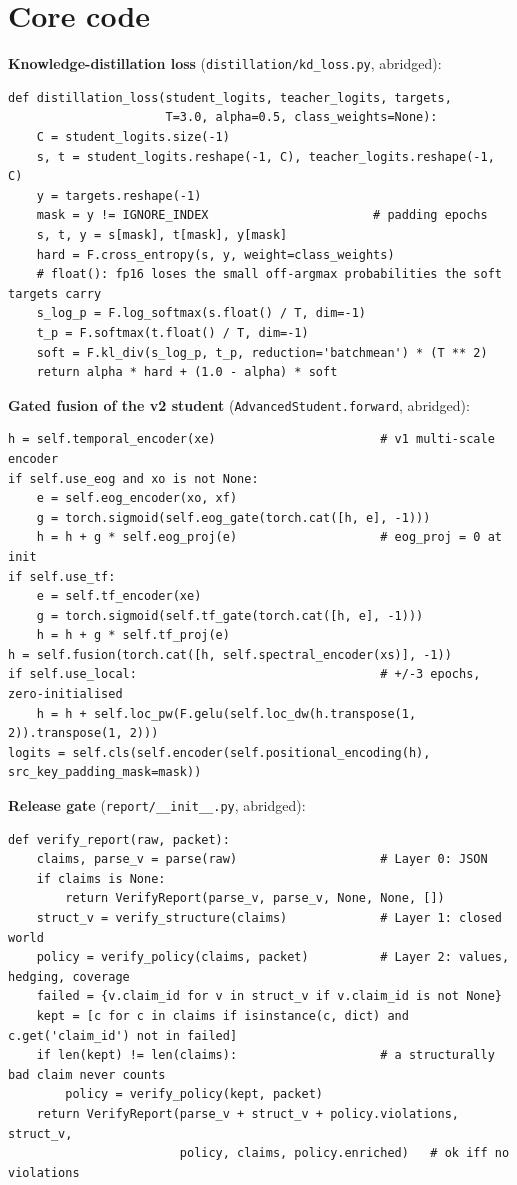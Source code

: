 \section{Core code}

\textbf{Knowledge-distillation loss} (\texttt{distillation/kd\_loss.py}, abridged):
\begin{lstlisting}
def distillation_loss(student_logits, teacher_logits, targets,
                      T=3.0, alpha=0.5, class_weights=None):
    C = student_logits.size(-1)
    s, t = student_logits.reshape(-1, C), teacher_logits.reshape(-1, C)
    y = targets.reshape(-1)
    mask = y != IGNORE_INDEX                       # padding epochs
    s, t, y = s[mask], t[mask], y[mask]
    hard = F.cross_entropy(s, y, weight=class_weights)
    # float(): fp16 loses the small off-argmax probabilities the soft targets carry
    s_log_p = F.log_softmax(s.float() / T, dim=-1)
    t_p = F.softmax(t.float() / T, dim=-1)
    soft = F.kl_div(s_log_p, t_p, reduction='batchmean') * (T ** 2)
    return alpha * hard + (1.0 - alpha) * soft
\end{lstlisting}

\textbf{Gated fusion of the v2 student} (\texttt{AdvancedStudent.forward}, abridged):
\begin{lstlisting}
h = self.temporal_encoder(xe)                       # v1 multi-scale encoder
if self.use_eog and xo is not None:
    e = self.eog_encoder(xo, xf)
    g = torch.sigmoid(self.eog_gate(torch.cat([h, e], -1)))
    h = h + g * self.eog_proj(e)                    # eog_proj = 0 at init
if self.use_tf:
    e = self.tf_encoder(xe)
    g = torch.sigmoid(self.tf_gate(torch.cat([h, e], -1)))
    h = h + g * self.tf_proj(e)
h = self.fusion(torch.cat([h, self.spectral_encoder(xs)], -1))
if self.use_local:                                  # +/-3 epochs, zero-initialised
    h = h + self.loc_pw(F.gelu(self.loc_dw(h.transpose(1, 2)).transpose(1, 2)))
logits = self.cls(self.encoder(self.positional_encoding(h), src_key_padding_mask=mask))
\end{lstlisting}

\textbf{Release gate} (\texttt{report/\_\_init\_\_.py}, abridged):
\begin{lstlisting}
def verify_report(raw, packet):
    claims, parse_v = parse(raw)                    # Layer 0: JSON
    if claims is None:
        return VerifyReport(parse_v, parse_v, None, None, [])
    struct_v = verify_structure(claims)             # Layer 1: closed world
    policy = verify_policy(claims, packet)          # Layer 2: values, hedging, coverage
    failed = {v.claim_id for v in struct_v if v.claim_id is not None}
    kept = [c for c in claims if isinstance(c, dict) and c.get('claim_id') not in failed]
    if len(kept) != len(claims):                    # a structurally bad claim never counts
        policy = verify_policy(kept, packet)
    return VerifyReport(parse_v + struct_v + policy.violations, struct_v,
                        policy, claims, policy.enriched)   # ok iff no violations
\end{lstlisting}

